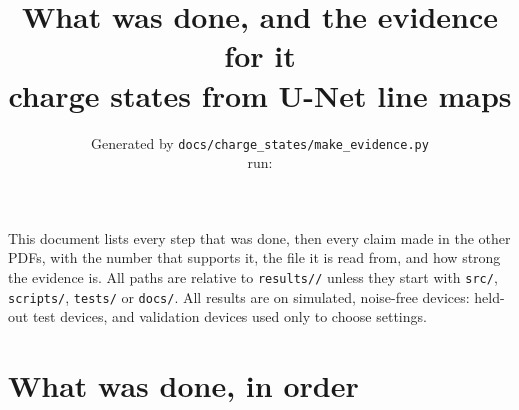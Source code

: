 \documentclass[9.5pt,a4paper]{article}
\title{What was done, and the evidence for it\\[2pt]
\large charge states from U-Net line maps}
\author{\small Generated by \texttt{docs/charge\_states/make\_evidence.py}\\
\small run: \texttt{\vRun}}
\date{}
\newcommand{\file}[1]{\texttt{\footnotesize #1}}
\begin{document}
\maketitle

\noindent
This document lists every step that was done, then every claim made in the
other PDFs, with the number that supports it, the file it is read from, and
how strong the evidence is.  All paths are relative to
\file{results/\vRun/} unless they start with \file{src/}, \file{scripts/},
\file{tests/} or \file{docs/}.  All results are on simulated, noise-free
devices: \vNT{} held-out test devices, and \vNV{} validation devices used
only to choose settings.

\section{What was done, in order}
\end{document}
